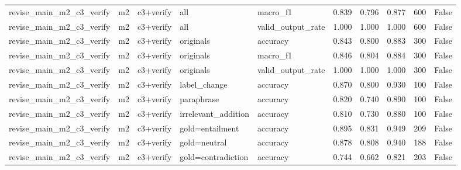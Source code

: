 \begin{tabular}{llllllllll}
revise\_main\_m2\_c3\_verify & m2 & c3+verify & all & macro\_f1 & 0.839 & 0.796 & 0.877 & 600 & False \\
revise\_main\_m2\_c3\_verify & m2 & c3+verify & all & valid\_output\_rate & 1.000 & 1.000 & 1.000 & 600 & False \\
revise\_main\_m2\_c3\_verify & m2 & c3+verify & originals & accuracy & 0.843 & 0.800 & 0.883 & 300 & False \\
revise\_main\_m2\_c3\_verify & m2 & c3+verify & originals & macro\_f1 & 0.846 & 0.804 & 0.884 & 300 & False \\
revise\_main\_m2\_c3\_verify & m2 & c3+verify & originals & valid\_output\_rate & 1.000 & 1.000 & 1.000 & 300 & False \\
revise\_main\_m2\_c3\_verify & m2 & c3+verify & label\_change & accuracy & 0.870 & 0.800 & 0.930 & 100 & False \\
revise\_main\_m2\_c3\_verify & m2 & c3+verify & paraphrase & accuracy & 0.820 & 0.740 & 0.890 & 100 & False \\
revise\_main\_m2\_c3\_verify & m2 & c3+verify & irrelevant\_addition & accuracy & 0.810 & 0.730 & 0.880 & 100 & False \\
revise\_main\_m2\_c3\_verify & m2 & c3+verify & gold=entailment & accuracy & 0.895 & 0.831 & 0.949 & 209 & False \\
revise\_main\_m2\_c3\_verify & m2 & c3+verify & gold=neutral & accuracy & 0.878 & 0.808 & 0.940 & 188 & False \\
revise\_main\_m2\_c3\_verify & m2 & c3+verify & gold=contradiction & accuracy & 0.744 & 0.662 & 0.821 & 203 & False \\
\bottomrule
\end{tabular}
